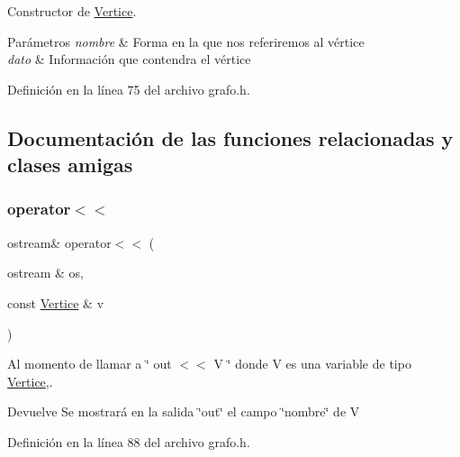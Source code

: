 Constructor de \hyperlink{classVertice}{Vertice}. 


\begin{DoxyParams}{Parámetros}
{\em nombre} & Forma en la que nos referiremos al vértice \\
\hline
{\em dato} & Información que contendra el vértice \\
\hline
\end{DoxyParams}


Definición en la línea 75 del archivo grafo.\+h.



\subsection{Documentación de las funciones relacionadas y clases amigas}
\mbox{\label{classVertice_a3c70523eb9e12f80bb42762ac4708819}} 
\subsubsection{\texorpdfstring{operator$<$$<$}{operator<<}\hspace{0.1cm}{\footnotesize\ttfamily [1/2]}}
{\footnotesize\ttfamily ostream\& operator$<$$<$ (\begin{DoxyParamCaption}\item[{ostream \&}]{os,  }\item[{const \hyperlink{classVertice}{Vertice} \&}]{v }\end{DoxyParamCaption})\hspace{0.3cm}{\ttfamily [friend]}}



Al momento de llamar a \char`\"{} out $<$$<$ V \char`\"{} donde V es una variable de tipo \hyperlink{classVertice}{Vertice},. 

\begin{DoxyReturn}{Devuelve}
Se mostrará en la salida \char`\"{}out\char`\"{} el campo \char`\"{}nombre\char`\"{} de V 
\end{DoxyReturn}


Definición en la línea 88 del archivo grafo.\+h.

\mbox{\label{classVertice_a11dd2c98c0d8abf3a52c680bc64ccc87}} 
